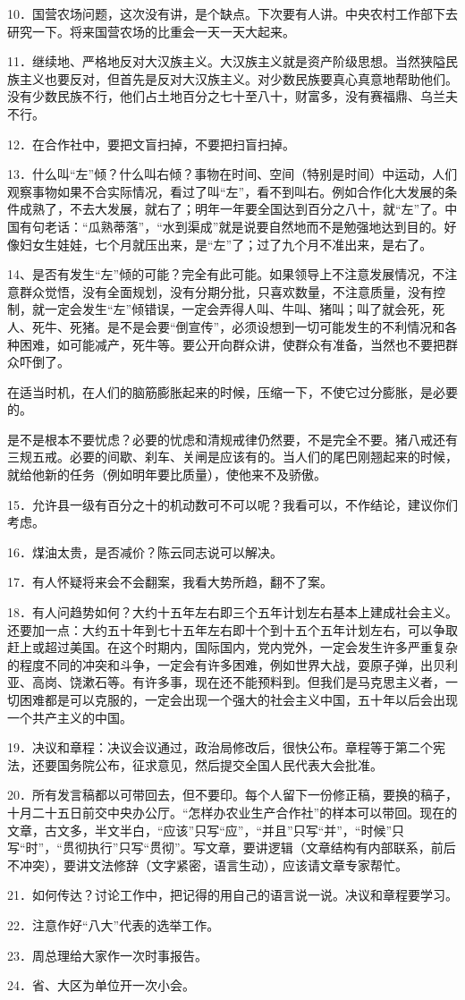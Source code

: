 10．国营农场问题，这次没有讲，是个缺点。下次要有人讲。中央农村工作部下去研究一下。将来国营农场的比重会一天一天大起来。

11．继续地、严格地反对大汉族主义。大汉族主义就是资产阶级思想。当然狭隘民族主义也要反对，但首先是反对大汉族主义。对少数民族要真心真意地帮助他们。没有少数民族不行，他们占土地百分之七十至八十，财富多，没有赛福鼎、乌兰夫不行。

12．在合作社中，要把文盲扫掉，不要把扫盲扫掉。

13．什么叫“左”倾？什么叫右倾？事物在时间、空间（特别是时间）中运动，人们观察事物如果不合实际情况，看过了叫“左”，看不到叫右。例如合作化大发展的条件成熟了，不去大发展，就右了；明年一年要全国达到百分之八十，就“左”了。中国有句老话：“瓜熟蒂落”，“水到渠成”就是说要自然地而不是勉强地达到目的。好像妇女生娃娃，七个月就压出来，是“左”了；过了九个月不准出来，是右了。

14、是否有发生“左”倾的可能？完全有此可能。如果领导上不注意发展情况，不注意群众觉悟，没有全面规划，没有分期分批，只喜欢数量，不注意质量，没有控制，就一定会发生“左”倾错误，一定会弄得人叫、牛叫、猪叫；叫了就会死，死人、死牛、死猪。是不是会要“倒宣传”，必须设想到一切可能发生的不利情况和各种困难，如可能减产，死牛等。要公开向群众讲，使群众有准备，当然也不要把群众吓倒了。

在适当时机，在人们的脑筋膨胀起来的时候，压缩一下，不使它过分膨胀，是必要的。

是不是根本不要忧虑？必要的忧虑和清规戒律仍然要，不是完全不要。猪八戒还有三规五戒。必要的间歇、刹车、关闸是应该有的。当人们的尾巴刚翘起来的时候，就给他新的任务（例如明年要比质量），使他来不及骄傲。

15．允许县一级有百分之十的机动数可不可以呢？我看可以，不作结论，建议你们考虑。

16．煤油太贵，是否减价？陈云同志说可以解决。

17．有人怀疑将来会不会翻案，我看大势所趋，翻不了案。

18．有人问趋势如何？大约十五年左右即三个五年计划左右基本上建成社会主义。还要加一点：大约五十年到七十五年左右即十个到十五个五年计划左右，可以争取赶上或超过美国。在这个时期内，国际国内，党内党外，一定会发生许多严重复杂的程度不同的冲突和斗争，一定会有许多困难，例如世界大战，耍原子弹，出贝利亚、高岗、饶漱石等。有许多事，现在还不能预料到。但我们是马克思主义者，一切困难都是可以克服的，一定会出现一个强大的社会主义中国，五十年以后会出现一个共产主义的中国。

19．决议和章程：决议会议通过，政治局修改后，很快公布。章程等于第二个宪法，还要国务院公布，征求意见，然后提交全国人民代表大会批准。

20．所有发言稿都以可带回去，但不要印。每个人留下一份修正稿，要换的稿子，十月二十五日前交中央办公厅。“怎样办农业生产合作社”的样本可以带回。现在的文章，古文多，半文半白，“应该”只写“应”，“并且”只写“并”，“时候”只写“时”，“贯彻执行”只写“贯彻”。写文章，要讲逻辑（文章结构有内部联系，前后不冲突），要讲文法修辞（文字紧密，语言生动），应该请文章专家帮忙。

21．如何传达？讨论工作中，把记得的用自己的语言说一说。决议和章程要学习。

22．注意作好“八大”代表的选举工作。

23．周总理给大家作一次时事报告。

24．省、大区为单位开一次小会。


